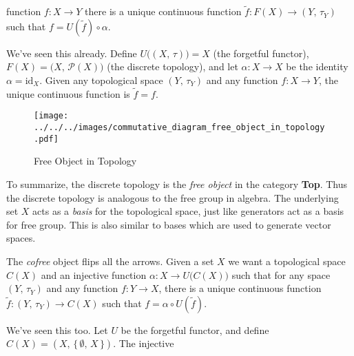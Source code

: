 \documentclass{article}
\theoremstyle{plain}
\theoremstyle{normal}
\begin{document}
            function $f:X\rightarrow{Y}$ there is a unique continuous function
            $\tilde{f}:F(X)\rightarrow(Y,\,\tau_{Y})$ such that
            $f=U(\tilde{f})\circ\alpha$.
            \par\hfill\par
            We've seen this already. Define $U\big((X,\,\tau)\big)=X$
            (the forgetful functor),
            $F(X)=\big(X,\,\mathcal{P}(X)\big)$ (the discrete topology),
            and let $\alpha:X\rightarrow{X}$ be the identity
            $\alpha=\textrm{id}_{X}$. Given any topological space
            $(Y,\,\tau_{Y})$ and any function $f:X\rightarrow{Y}$, the
            unique continuous function is $\tilde{f}=f$.
            \begin{figure}
                \centering
                \texttt{[image: ../../../images/commutative\_diagram\_free\_object\_in\_topology.pdf]}
                \caption{Free Object in Topology}
                \label{fig:commutative_diagram_free_object_in_topology}
            \end{figure}
            \par\hfill\par
            To summarize, the discrete topology%
            is the \textit{free object}
            in the category \textbf{Top}. Thus the discrete topology is
            analogous to the free group in algebra. The underlying set $X$
            acts as a \textit{basis} for the topological space, just like
            generators act as a basis for free group. This is also similar to
            bases which are used to generate vector spaces.
            \par\hfill\par
            The \textit{cofree} object
            flips all the arrows. Given a set
            $X$ we want a topological space $C(X)$ and an injective function
            $\alpha:X\rightarrow{U}\big(C(X)\big)$ such that for any space
            $(Y,\,\tau_{Y})$ and any function $f:Y\rightarrow{X}$, there is a
            unique continuous function
            $\tilde{f}:(Y,\,\tau_{Y})\rightarrow{C}(X)$ such that
            $f=\alpha\circ{U}(\tilde{f})$.
            \par\hfill\par
            We've seen this too. Let $U$ be the forgetful functor,
            and define $C(X)=(X,\,\{\,\emptyset,\,X\,\})$.%
            The injective
\end{document}
